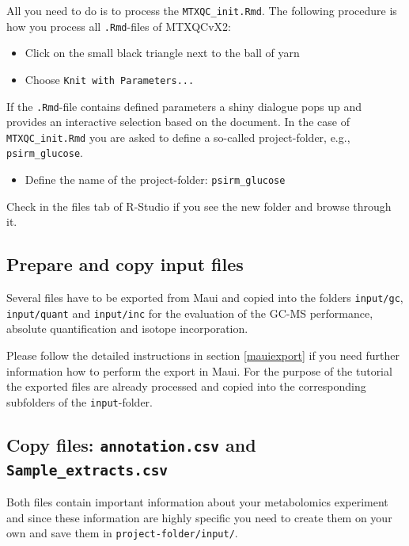 \documentclass[]{book}
\providecommand{\tightlist}{%
  \setlength{\itemsep}{0pt}\setlength{\parskip}{0pt}}
\theoremstyle{definition}
\theoremstyle{definition}
\theoremstyle{definition}
\theoremstyle{remark}
\begin{document}
All you need to do is to process the \texttt{MTXQC\_init.Rmd}. The
following procedure is how you process all \texttt{.Rmd}-files of
MTXQCvX2:

\begin{itemize}
\tightlist
\item
  Click on the small black triangle next to the ball of yarn
\item
  Choose \texttt{Knit\ with\ Parameters...}
\end{itemize}

If the \texttt{.Rmd}-file contains defined parameters a shiny dialogue
pops up and provides an interactive selection based on the document. In
the case of \texttt{MTXQC\_init.Rmd} you are asked to define a so-called
project-folder, e.g., \texttt{psirm\_glucose}.

\begin{itemize}
\tightlist
\item
  Define the name of the project-folder: \texttt{psirm\_glucose}
\end{itemize}

Check in the files tab of R-Studio if you see the new folder and browse
through it.

\subsection{Prepare and copy input
files}\label{prepare-and-copy-input-files}

Several files have to be exported from Maui and copied into the folders
\texttt{input/gc}, \texttt{input/quant} and \texttt{input/inc} for the
evaluation of the GC-MS performance, absolute quantification and isotope
incorporation.

Please follow the detailed instructions in section \ref{mauiexport} if
you need further information how to perform the export in Maui. For the
purpose of the tutorial the exported files are already processed and
copied into the corresponding subfolders of the \texttt{input}-folder.

\subsection{\texorpdfstring{Copy files: \texttt{annotation.csv} and
\texttt{Sample\_extracts.csv}}{Copy files: annotation.csv and Sample\_extracts.csv}}\label{copy-files-annotation.csv-and-sample_extracts.csv}

Both files contain important information about your metabolomics
experiment and since these information are highly specific you need to
create them on your own and save them in \texttt{project-folder/input/}.
\end{document}
